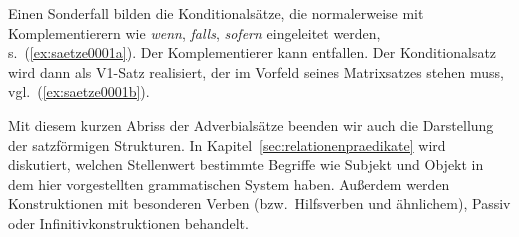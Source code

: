 Einen Sonderfall bilden die Konditionalsätze, die normalerweise mit Komplementierern wie \textit{wenn}, \textit{falls}, \textit{sofern} eingeleitet werden, s.\ (\ref{ex:saetze0001a}).
Der Komplementierer kann entfallen.
Der Konditionalsatz wird dann als V1-Satz realisiert, der im Vorfeld seines Matrixsatzes stehen muss, vgl.\ (\ref{ex:saetze0001b}).

\begin{exe}
  \ex\label{ex:saetze0001}
  \begin{xlist}
  \end{xlist}
\end{exe}

Mit diesem kurzen Abriss der Adverbialsätze beenden wir auch die Darstellung der satzförmigen Strukturen.
In Kapitel~\ref{sec:relationenpraedikate} wird diskutiert, welchen Stellenwert bestimmte Begriffe wie Subjekt und Objekt in dem hier vorgestellten grammatischen System haben.
Außerdem werden Konstruktionen mit besonderen Verben (bzw.\ Hilfsverben und ähnlichem), \zB Passiv oder Infinitivkonstruktionen behandelt.

\Zusammenfassung

